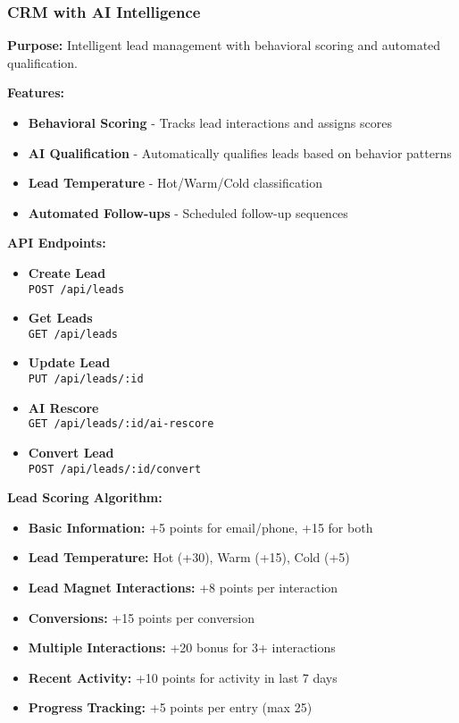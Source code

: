 \documentclass[12pt,a4paper]{article}
\newcommand{\apiendpoint}[2]{\textbf{#1} \\ \texttt{#2}}
\begin{document}
\subsubsection{CRM with AI Intelligence}
\textbf{Purpose:} Intelligent lead management with behavioral scoring and automated qualification.

\textbf{Features:}
\begin{itemize}
    \item \textbf{Behavioral Scoring} - Tracks lead interactions and assigns scores
    \item \textbf{AI Qualification} - Automatically qualifies leads based on behavior patterns
    \item \textbf{Lead Temperature} - Hot/Warm/Cold classification
    \item \textbf{Automated Follow-ups} - Scheduled follow-up sequences
\end{itemize}

\textbf{API Endpoints:}
\begin{itemize}
    \item \apiendpoint{Create Lead}{POST /api/leads}
    \item \apiendpoint{Get Leads}{GET /api/leads}
    \item \apiendpoint{Update Lead}{PUT /api/leads/:id}
    \item \apiendpoint{AI Rescore}{GET /api/leads/:id/ai-rescore}
    \item \apiendpoint{Convert Lead}{POST /api/leads/:id/convert}
\end{itemize}

\textbf{Lead Scoring Algorithm:}
\begin{itemize}
    \item \textbf{Basic Information:} +5 points for email/phone, +15 for both
    \item \textbf{Lead Temperature:} Hot (+30), Warm (+15), Cold (+5)
    \item \textbf{Lead Magnet Interactions:} +8 points per interaction
    \item \textbf{Conversions:} +15 points per conversion
    \item \textbf{Multiple Interactions:} +20 bonus for 3+ interactions
    \item \textbf{Recent Activity:} +10 points for activity in last 7 days
    \item \textbf{Progress Tracking:} +5 points per entry (max 25)
\end{itemize}
\end{document}
